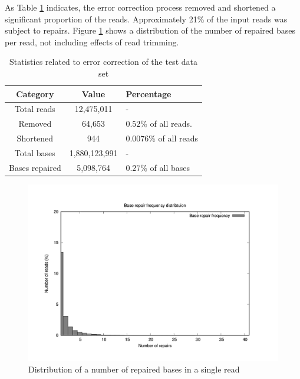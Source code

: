 As Table \ref{tab:test-correction} indicates, the error correction process removed and shortened a significant proportion of the reads. Approximately 21\% of the input reads was subject to repairs. Figure \ref{fig:test-repair-frequency} shows a distribution of the number of repaired bases per read, not including effects of read trimming.

\begin{table}[h]
\begin{center}
\caption{Statistics related to error correction of the test data set}
\label{tab:test-correction}
\begin{tabular}{| c | c | p{5cm} |}
\hline
Category & Value & Percentage \\
\hline
Total reads & 12,475,011 & - \\
\hline
Removed & 64,653 &  $0.52$\% of all reads. \\
\hline
Shortened & 944 & $0.0076$\% of all reads \\
\hline
Total bases & 1,880,123,991 & - \\
\hline
Bases repaired & 5,098,764 &  $0.27$\% of all bases \\
\hline
\end{tabular}
\end{center}
\end{table}

\begin{figure}[h]
	\centering
	\includegraphics{img/test-repair-frequency.pdf}
	\caption{Distribution of a number of repaired bases in a single read}
	\label{fig:test-repair-frequency}
\end{figure}

